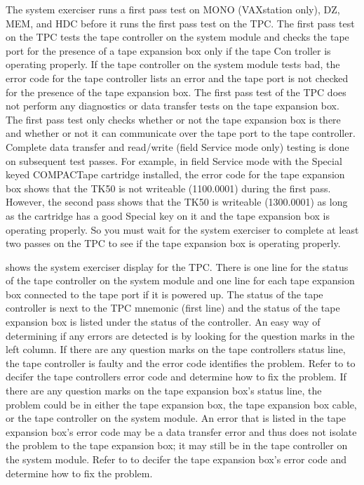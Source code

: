 The system exerciser runs a first pass test on MONO (VAXstation only), DZ,
MEM, and HDC before it runs the first pass test on the TPC. The first pass
test on the TPC tests the tape controller on the system module and checks
the tape port for the presence of a tape expansion box only if the tape Con
troller is operating properly. If the tape controller on the system module
tests bad, the error code for the tape controller lists an error and the tape
port is not checked for the presence of the tape expansion box. The first
pass test of the TPC does not perform any diagnostics or data transfer tests
on the tape expansion box. The first pass test only checks whether or not the
tape expansion box is there and whether or not it can communicate over the
tape port to the tape controller. Complete data transfer and read/write (field
Service mode only) testing is done on subsequent test passes. For example, 
in field Service mode with the Special keyed COMPACTape cartridge
installed, the error code for the tape expansion box shows that the TK50 is
not writeable (1100.0001) during the first pass. However, the second pass
shows that the TK50 is writeable (1300.0001) as long as the cartridge has a
good Special key on it and the tape expansion box is operating properly.
So you must wait for the system exerciser to complete at least two passes
on the TPC to see if the tape expansion box is operating properly.

 shows the system exerciser display for the TPC. There is one
line for the status of the tape controller on the system module and one line
for each tape expansion box connected to the tape port if it is powered
up. The status of the tape controller is next to the TPC mnemonic (first
line) and the status of the tape expansion box is listed under the status of
the controller. An easy way of determining if any errors are detected is by
looking for the question marks in the left column. If there are any question
marks on the tape controllers status line, the tape controller is faulty and
the error code identifies the problem. Refer to  to decifer the tape
controllers error code and determine how to fix the problem. If there are
any question marks on the tape expansion box's status line, the problem
could be in either the tape expansion box, the tape expansion box cable, or
the tape controller on the system module. An error that is listed in the tape
expansion box's error code may be a data transfer error and thus does not
isolate the problem to the tape expansion box; it may still be in the tape
controller on the system module. Refer to  to decifer the tape
expansion box's error code and determine how to fix the problem.

